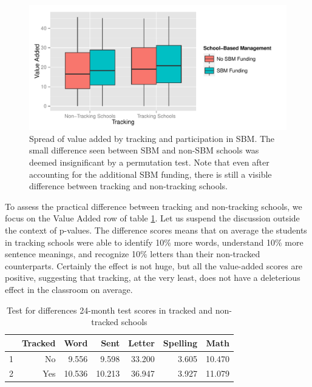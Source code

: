 \documentclass[11pt]{article}
\begin{document}
  \begin{figure}[H]
  	\centering
  	\includegraphics[scale=0.8]{../Figures/ValueAddedTrackSBM.pdf}
  	\caption{Spread of value added by tracking and participation in SBM. The small difference seen between SBM and non-SBM schools was deemed insignificant by a permutation test.  Note that even after accounting for the additional SBM funding, there is still a visible difference between tracking and non-tracking schools.}
  	\label{fig:ValueAddedTrackSBM}
  \end{figure} 

To assess the practical difference between tracking and non-tracking schools, we focus on the Value Added row of table \ref{tab:practical}.  Let us suspend the discussion outside the context of p-values.  The difference scores means that on average the students in tracking schools were able to identify 10\% more words, understand 10\% more sentence meanings, and recognize 10\% letters than their non-tracked counterparts.  Certainly the effect is not huge, but all the value-added scores are positive, suggesting that tracking, at the very least, does not have a deleterious effect in the classroom on average.


\begin{table}[ht]
	\centering
	\begin{tabular}{rrrrrrr}
		\hline
		& Tracked & Word & Sent & Letter & Spelling & Math \\ 
		\hline
		1 & No & 9.556 & 9.598 & 33.200 & 3.605 & 10.470 \\ 
		2 & Yes & 10.536 & 10.213 & 36.947 & 3.927 & 11.079 \\ 
		\hline
	\end{tabular}
	\label{tab:practical}
	\caption{Test for differences 24-month test scores in tracked and non-tracked schools} 
\end{table}
\end{document}
